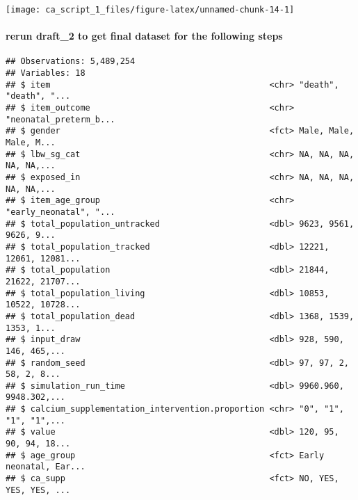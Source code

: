 \documentclass[]{article}
\newenvironment{Shaded}{\begin{snugshade}}{\end{snugshade}}
\newcommand{\KeywordTok}[1]{\textcolor[rgb]{0.13,0.29,0.53}{\textbf{#1}}}
\newcommand{\NormalTok}[1]{#1}
\newcommand{\OperatorTok}[1]{\textcolor[rgb]{0.81,0.36,0.00}{\textbf{#1}}}
\newcommand{\StringTok}[1]{\textcolor[rgb]{0.31,0.60,0.02}{#1}}
\let\oldparagraph\paragraph
\renewcommand{\paragraph}[1]{\oldparagraph{#1}\mbox{}}
\begin{document}
\begin{center}\texttt{[image: ca\_script\_1\_files/figure-latex/unnamed-chunk-14-1]} \end{center}

\hypertarget{rerun-draft_2-to-get-final-dataset-for-the-following-steps}{%
\paragraph{rerun draft\_2 to get final dataset for the following
steps}\label{rerun-draft_2-to-get-final-dataset-for-the-following-steps}}

\begin{Shaded}
\end{Shaded}

\begin{verbatim}
## Observations: 5,489,254
## Variables: 18
## $ item                                            <chr> "death", "death", "...
## $ item_outcome                                    <chr> "neonatal_preterm_b...
## $ gender                                          <fct> Male, Male, Male, M...
## $ lbw_sg_cat                                      <chr> NA, NA, NA, NA, NA,...
## $ exposed_in                                      <chr> NA, NA, NA, NA, NA,...
## $ item_age_group                                  <chr> "early_neonatal", "...
## $ total_population_untracked                      <dbl> 9623, 9561, 9626, 9...
## $ total_population_tracked                        <dbl> 12221, 12061, 12081...
## $ total_population                                <dbl> 21844, 21622, 21707...
## $ total_population_living                         <dbl> 10853, 10522, 10728...
## $ total_population_dead                           <dbl> 1368, 1539, 1353, 1...
## $ input_draw                                      <dbl> 928, 590, 146, 465,...
## $ random_seed                                     <dbl> 97, 97, 2, 58, 2, 8...
## $ simulation_run_time                             <dbl> 9960.960, 9948.302,...
## $ calcium_supplementation_intervention.proportion <chr> "0", "1", "1", "1",...
## $ value                                           <dbl> 120, 95, 90, 94, 18...
## $ age_group                                       <fct> Early neonatal, Ear...
## $ ca_supp                                         <fct> NO, YES, YES, YES, ...
\end{verbatim}
\end{document}
